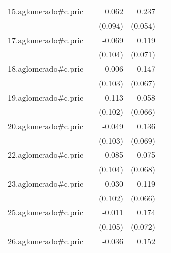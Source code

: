 {\begin{longtable}{l*{4}{D{.}{.}{-1}}}
\addlinespace
15.aglomerado#c.pric&                     &       0.062         &       0.237\sym{***}&                     \\
            &                     &     (0.094)         &     (0.054)         &                     \\
\addlinespace
17.aglomerado#c.pric&                     &      -0.069         &       0.119         &                     \\
            &                     &     (0.104)         &     (0.071)         &                     \\
\addlinespace
18.aglomerado#c.pric&                     &       0.006         &       0.147\sym{*}  &                     \\
            &                     &     (0.103)         &     (0.067)         &                     \\
\addlinespace
19.aglomerado#c.pric&                     &      -0.113         &       0.058         &                     \\
            &                     &     (0.102)         &     (0.066)         &                     \\
\addlinespace
20.aglomerado#c.pric&                     &      -0.049         &       0.136\sym{*}  &                     \\
            &                     &     (0.103)         &     (0.069)         &                     \\
\addlinespace
22.aglomerado#c.pric&                     &      -0.085         &       0.075         &                     \\
            &                     &     (0.104)         &     (0.068)         &                     \\
\addlinespace
23.aglomerado#c.pric&                     &      -0.030         &       0.119         &                     \\
            &                     &     (0.102)         &     (0.066)         &                     \\
\addlinespace
25.aglomerado#c.pric&                     &      -0.011         &       0.174\sym{*}  &                     \\
            &                     &     (0.105)         &     (0.072)         &                     \\
\addlinespace
26.aglomerado#c.pric&                     &      -0.036         &       0.152\sym{*}  &                     \\

\end{longtable}}
